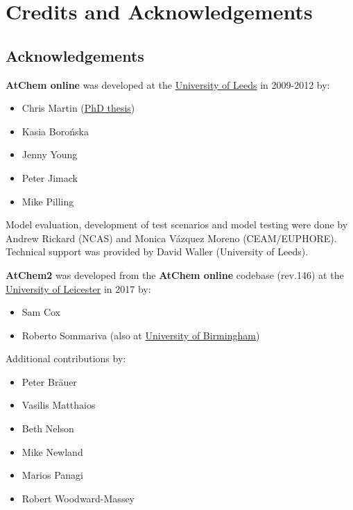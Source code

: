 %
%
%
%
\chapter{Credits and Acknowledgements} \label{ch:credits}

\section{Acknowledgements} \label{sec:acknowledgements}

\textbf{AtChem online} was developed at the
\href{https://www.leeds.ac.uk}{University of Leeds} in 2009-2012 by:

\begin{itemize}
\item Chris Martin (\href{http://etheses.whiterose.ac.uk/1596/}{PhD
    thesis})
\item Kasia Boro{\'n}ska
\item Jenny Young
\item Peter Jimack
\item Mike Pilling
\end{itemize}

Model evaluation, development of test scenarios and model testing were
done by Andrew Rickard (NCAS) and Monica V{\'a}zquez Moreno (CEAM/EUPHORE).
Technical support was provided by David Waller (University of Leeds).

\textbf{AtChem2} was developed from the \textbf{AtChem online}
codebase (rev.146) at the \href{https://le.ac.uk}{University of
  Leicester} in 2017 by:

\begin{itemize}
\item Sam Cox
\item Roberto Sommariva (also at \href{https://www.birmingham.ac.uk}{University of Birmingham})
\end{itemize}

Additional contributions by:

\begin{itemize}
\item Peter Br{\"a}uer
\item Vasilis Matthaios
\item Beth Nelson
\item Mike Newland
\item Marios Panagi
\item Robert Woodward-Massey
\end{itemize}

